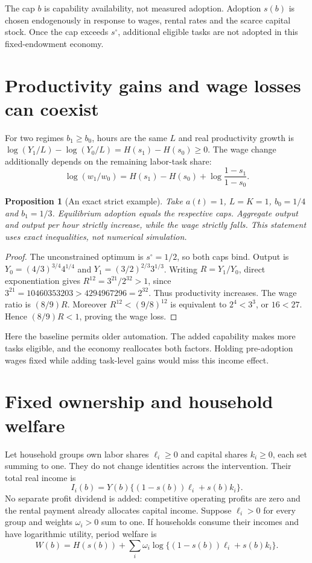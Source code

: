 \documentclass[11pt]{article}
\newtheorem{proposition}[theorem]{Proposition}
\theoremstyle{remark}\newtheorem{remark}[theorem]{Remark}
\begin{document}
The cap $b$ is capability availability, not measured adoption. Adoption $s(b)$ is chosen endogenously in response to wages, rental rates and the scarce capital stock. Once the cap exceeds $s^\circ$, additional eligible tasks are not adopted in this fixed-endowment economy.

\section*{Productivity gains and wage losses can coexist}
For two regimes $b_1\ge b_0$, hours are the same $L$ and real productivity growth is
$\log(Y_1/L)-\log(Y_0/L)=H(s_1)-H(s_0)\ge0$.
The wage change additionally depends on the remaining labor-task share:
\[
 \log(w_1/w_0)=H(s_1)-H(s_0)+\log\frac{1-s_1}{1-s_0}.
\]

\begin{proposition}[An exact strict example]
Take $a(t)=1$, $L=K=1$, $b_0=1/4$ and $b_1=1/3$. Equilibrium adoption equals the respective caps. Aggregate output and output per hour strictly increase, while the wage strictly falls. This statement uses exact inequalities, not numerical simulation.
\end{proposition}
\begin{proof}
The unconstrained optimum is $s^\circ=1/2$, so both caps bind. Output is
$Y_0=(4/3)^{3/4}4^{1/4}$ and
$Y_1=(3/2)^{2/3}3^{1/3}$.
Writing $R=Y_1/Y_0$, direct exponentiation gives
$R^{12}=3^{21}/2^{32}>1$, since $3^{21}=10460353203>4294967296=2^{32}$. Thus productivity increases. The wage ratio is $(8/9)R$. Moreover
$R^{12}<(9/8)^{12}$ is equivalent to $2^4<3^3$, or $16<27$. Hence $(8/9)R<1$, proving the wage loss.
\end{proof}

Here the baseline permits older automation. The added capability makes more tasks eligible, and the economy reallocates both factors. Holding pre-adoption wages fixed while adding task-level gains would miss this income effect.

\section*{Fixed ownership and household welfare}
Let household groups own labor shares $\ell_i\ge0$ and capital shares $k_i\ge0$, each set summing to one. They do not change identities across the intervention. Their total real income is
\[
 I_i(b)=Y(b)\{(1-s(b))\ell_i+s(b)k_i\}.
\]
No separate profit dividend is added: competitive operating profits are zero and the rental payment already allocates capital income. Suppose $\ell_i>0$ for every group and weights $\omega_i>0$ sum to one. If households consume their incomes and have logarithmic utility, period welfare is
\[
 W(b)=H(s(b))+\sum_i\omega_i
 \log\{(1-s(b))\ell_i+s(b)k_i\}.
\]
\end{document}
